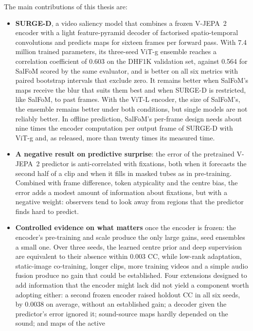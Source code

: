 The main contributions of this thesis are:
\begin{itemize}
  \item \textbf{SURGE-D}, a video saliency model that combines a frozen \acrshort{V-JEPA}~2
    encoder with a light feature-pyramid decoder of factorised spatio-temporal
    convolutions and predicts maps for sixteen frames per forward pass. With
    7.4 million trained parameters, its three-seed \acrshort{ViT}-g ensemble reaches a
    correlation coefficient of 0.603 on the DHF1K validation set, against 0.564
    for SalFoM scored by the same evaluator, and is better on all six metrics
    with paired bootstrap intervals that exclude zero. It remains better when
    SalFoM's maps receive the blur that suits them best and when SURGE-D is
    restricted, like SalFoM, to past frames. With the \acrshort{ViT}-L encoder, the size of
    SalFoM's, the ensemble remains better under both conditions, but single
    models are not reliably better. In offline prediction, SalFoM's
    per-frame design needs about nine times the encoder computation per
    output frame of SURGE-D with \acrshort{ViT}-g and, as released, more than
    twenty times its measured time.
  \item \textbf{A negative result on predictive surprise}: the error of the
    pretrained \acrshort{V-JEPA}~2 predictor is anti-correlated with fixations, both
    when it forecasts the second half of a clip and when it fills in masked
    tubes as in pre-training. Combined with frame difference, token
    atypicality and the centre bias, the error adds a modest amount of
    information about fixations, but with a negative weight: observers tend to
    look away from regions that the predictor finds hard to predict.
  \item \textbf{Controlled evidence on what matters} once the encoder is frozen:
    the encoder's pre-training and scale produce the only large gains, seed
    ensembles a small one. Over three seeds, the learned centre prior and deep
    supervision are equivalent to their absence within 0.003 \acrshort{CC}, while
    low-rank adaptation, static-image co-training, longer clips, more training
    videos and a simple audio fusion produce no gain that could be established.
    Four extensions designed to add information that the encoder might lack
    did not yield a component worth adopting either: a second frozen encoder
    raised holdout \acrshort{CC} in all six seeds, by 0.0038 on average, without an
    established gain; a decoder given the predictor's error ignored it;
    sound-source maps hardly depended on the sound; and maps of the active

\end{itemize}
